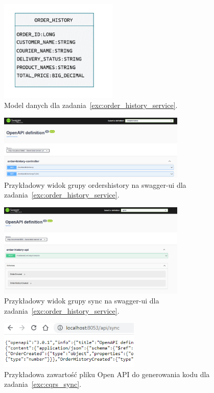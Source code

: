 \documentclass[12pt]{article}
\begin{document}
    \begin{figure}[p]
        \centering
        \includegraphics[width=0.5\textwidth]{read-model.png}
        \caption{Model danych dla zadania~\ref{exc:order_history_service}.}
        \label{fig:read-model}
    \end{figure}  
    \begin{figure}[p]
        \centering
        \includegraphics[width=0.8\textwidth]{lista-3-2-a}
        \caption{Przykładowy widok grupy ordershistory na swagger-ui dla zadania~\ref{exc:order_history_service}.}
        \label{fig:swagger-orders-gr}
    \end{figure}  
    \begin{figure}[p]
        \centering
        \includegraphics[width=0.8\textwidth]{lista-3-2-b}
        \caption{Przykładowy widok grupy sync na swagger-ui dla zadania~\ref{exc:order_history_service}.}
        \label{fig:swagger-sync-gr}
    \end{figure}
    \begin{figure}[p]
        \centering
        \includegraphics[width=0.6\textwidth]{lista-3-3-a}
        \caption{Przykładowa zawartość pliku Open API do generowania kodu dla zadania~\ref{exc:cqrs_sync}.}
        \label{fig:openapi-gen}
    \end{figure}
\end{document}
